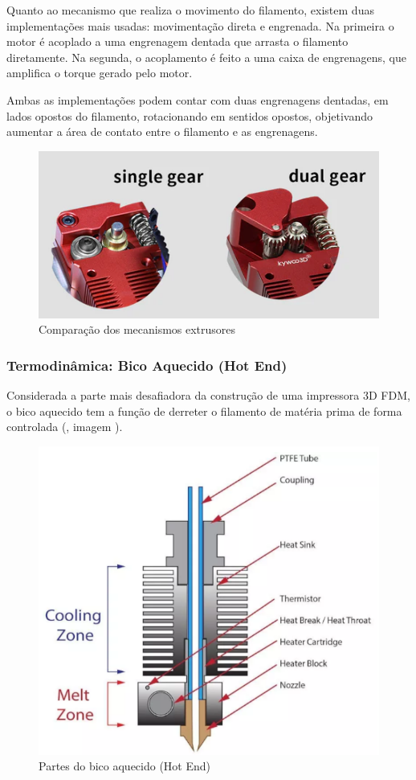 \documentclass[12pt, english]{article}
\begin{document}
Quanto ao mecanismo que realiza o movimento do filamento, existem duas implementações mais usadas: movimentação direta e engrenada. Na primeira o motor é acoplado a uma engrenagem dentada que arrasta o filamento diretamente. Na segunda, o acoplamento é feito a uma caixa de engrenagens, que amplifica o torque gerado pelo motor.

Ambas as implementações podem contar com  duas engrenagens dentadas, em lados opostos do filamento, rotacionando em sentidos opostos, objetivando aumentar a área de contato entre o filamento e as engrenagens.

\begin{figure}[H]
	\centering
	\includegraphics[height=.4\linewidth]{extruder-gear.png}
	\caption{Comparação dos mecanismos extrusores}
\end{figure}

\subsubsection{Termodinâmica: Bico Aquecido (Hot End)}

Considerada a parte mais desafiadora da construção de uma impressora 3D FDM, o bico aquecido tem a função de derreter o filamento de matéria prima de forma controlada (\cite{REPRAP:HotEndDesignTheory}, imagem \cite{FILAMENT2PRINT}).

\begin{figure}[H]
	\centering
	\includegraphics[height=.4\linewidth]{hot-end.png}
	\caption{Partes do bico aquecido (Hot End)}
\end{figure}
\end{document}
